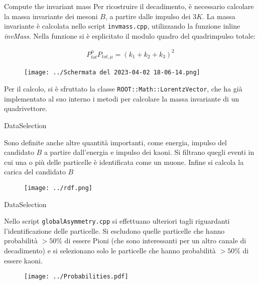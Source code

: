 \documentclass[8pt,a4paper]{beamer}
\begin{document}
\begin{frame}{Compute the invariant mass}
Per ricostruire il decadimento, è necessario calcolare la massa invariante dei mesoni $B$, a partire dalle impulso dei $3K$. La massa invariante è calcolata nello script \texttt{invmass.cpp}, utilizzando la funzione inline \textit{invMass}. Nella funzione si è esplicitato il modulo quadro del quadrimpulso totale:

\begin{align*}
P_{tot}^{\mu}P_{tot,\mu} = (k_{1} + k_{2} + k_{3})^{2}
\end{align*}

\begin{figure}[hbtp]
\centering
\texttt{[image: ../Schermata del 2023-04-02 18-06-14.png]}
\end{figure}

Per il calcolo, si è sfruttato la classe \texttt{ROOT::Math::LorentzVector}, che ha già implementato al suo interno i metodi per calcolare la massa invariante di un quadrivettore.
\end{frame}

\begin{frame}{DataSelection}

Sono definite anche altre quantità importanti, come energia, impulso del candidato $B$ a partire dall'energia e impulso dei kaoni. Si filtrano quegli eventi in cui una o più delle particelle è identificata come un muone. Infine si calcola la carica del candidato $B$

\begin{figure}[hbtp]
\centering
\texttt{[image: ../rdf.png]}
\end{figure}
\end{frame}

\begin{frame}{DataSelection}

Nello script \texttt{globalAsymmetry.cpp} si effettuano ulteriori tagli riguardanti l'identificazione delle particelle. Si escludono quelle particelle che hanno probabilità $> 50 \%$ di essere Pioni (che sono interessanti per un altro canale di decadimento) e si selezionano solo le particelle che hanno probabilità $> 50 \%$ di essere kaoni.

\begin{figure}[hbtp]
\centering
\texttt{[image: ../Probabilities.pdf]}
\end{figure}
\end{frame}
\end{document}
